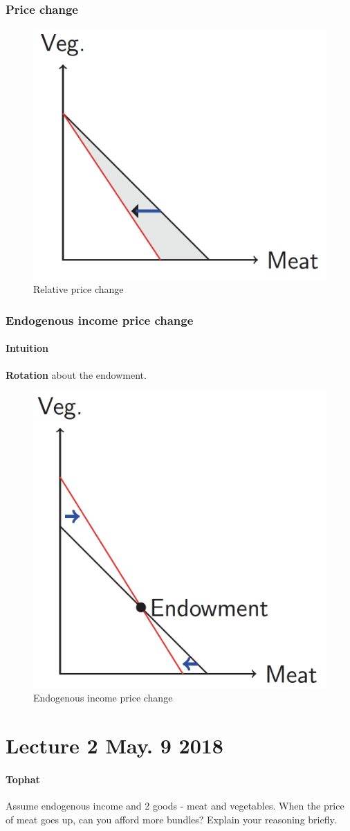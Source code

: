 \documentclass{article}
\begin{document}
	\subsubsection{Price change}
	\begin{figure}[!htb]
		\centering
		\includegraphics[width=0.5\linewidth]{eco206pic/relative_price_change}
		\caption{Relative price change}
	\end{figure}
	
	\subsubsection{Endogenous income price change}
	\paragraph{Intuition} \textbf{Rotation} about the endowment.
	\begin{figure}[!htb]
		\centering
		\includegraphics[width=0.5\linewidth]{eco206pic/End_price_change}
		\caption{Endogenous income price change}
	\end{figure}
	

\section{Lecture 2 May. 9 2018}
\paragraph{Tophat} Assume endogenous income and 2 goods - meat and vegetables. When the price of meat goes up, can you afford more bundles? Explain your reasoning briefly.
\end{document}

